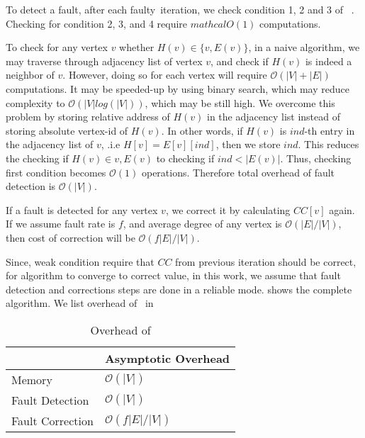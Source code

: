 To detect a fault, after each faulty~\sv iteration, we check condition 1, 2 and 3 of ~. Checking for condition 2, 3, and 4 require $mathcal{O}(1)$ computations. 

 To check for any vertex $v$ whether $H(v) \in \{ v, E(v)\}$, in a naive algorithm, 
we may traverse through adjacency list of vertex $v$, and check if $H(v)$ is indeed a neighbor of $v$. However, doing so for each vertex will require $\mathcal{O}(|V|+|E|)$ computations. It may be speeded-up by using binary search, which may reduce complexity to $\mathcal{O}(|V|log(|V|))$, which may be still high. 
We  overcome this problem by storing relative address of $H(v)$ in the adjacency list instead of storing absolute vertex-id of $H(v)$.
 In other words, if $H(v)$ is $ind$-th entry in the adjacency list of $v$, .i.e $H[v]=E[v][ind]$, 
 then we store $ind$. This reduces the checking if $H(v)\in{v,E(v)}$ to checking if $ind<|E(v)|$.  Thus, checking first condition becomes $\mathcal{O}(1)$ operations. 
 Therefore total overhead of fault detection is  $\mathcal{O}(|V|)$.

If a fault is detected for any vertex $v$, we correct it by calculating $CC[v]$ again. 
If we assume fault rate is $f$, and average degree of any vertex is $\mathcal{O}(|E|/|V|)$, 
then cost of correction will be $\mathcal{O}(f|E|/|V|)$.

Since, weak condition require that $CC$ from previous iteration should be correct, for algorithm
to converge to correct value, in this work, we assume that fault detection and corrections steps 
are done in a reliable mode.   shows the complete algorithm.
We list overhead of~ in 

\begin{table}[htbp]
\centering
\caption{Overhead of \ftsv}
\label{tab:overhead}
\begin{tabular}{l|l}
\toprule 
                 & Asymptotic Overhead     \\
\midrule                  
Memory           & $\mathcal{O}(|V|)$      \\
Fault Detection  & $\mathcal{O}(|V|)$      \\
Fault Correction & $\mathcal{O}(f|E|/|V|)$ \\
\bottomrule 
\end{tabular}
\end{table}